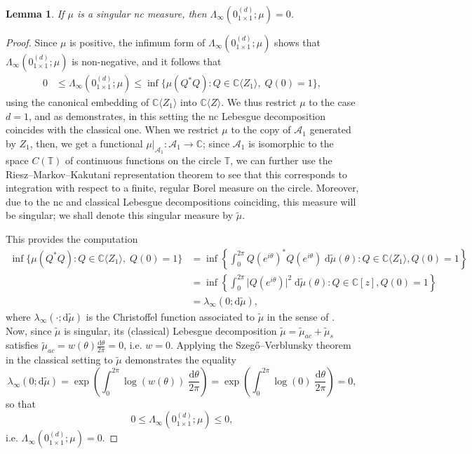 \documentclass[11pt,reqno]{amsart}
\def\l{\lambda}
\def\th{\theta}
\def\L{\Lambda}
\def\rmd{\mathrm{d}}
\def\CC{\mathbb{C}}
\def\TT{\mathbb{T}}
\def\cA{\mathcal{A}}
\newtheorem{lemma}[theorem]{Lemma}
\theoremstyle{definition}
\numberwithin{equation}{section}
\renewcommand{\tilde}{\widetilde}
\begin{document}
\begin{lemma}
    \label{lem:ZeroEntropy}
    If \(\mu\) is a singular nc measure, then \(\L_{\infty}(0_{1\times1}^{(d)}; \mu) = 0\).
\end{lemma}
\begin{proof}
    
    Since \(\mu\) is positive, the infimum form of \(\L_{\infty}(0_{1\times 1}^{(d)}; \mu)\) shows that \(\L_{\infty}(0_{1\times 1}^{(d)}; \mu)\) is non-negative, and it follows that
    \begin{align*}
        0 & \leq \L_{\infty}(0_{1\times 1}^{(d)}; \mu) \leq \inf\{\mu(Q^*Q) : Q \in \CC\langle Z_1\rangle, \; Q(0) = 1\},
    \end{align*}
    using the canonical embedding of \(\CC\langle Z_1\rangle\) into \(\CC\langle Z \rangle\). We thus restrict \(\mu\) to the case \(d = 1\), and as \cite[Corollary 8.5]{JM22b} demonstrates, in this setting the nc Lebesgue decomposition coincides with the classical one. When we restrict \(\mu\) to the copy of \(\cA_1\) generated by \(Z_1\), then, we get a functional \(\mu \vert_{\cA_1} : \cA_1 \to \CC\); since \(\cA_1\) is isomorphic to the space \(C(\TT)\) of continuous functions on the circle \(\TT\), we can further use the Riesz--Markov--Kakutani representation theorem \cite[Theorem 2.17]{Rud87} to see that this corresponds to integration with respect to a finite, regular Borel measure on the circle. Moreover, due to the nc and classical Lebesgue decompositions coinciding, this measure will be singular; we shall denote this singular measure by \(\tilde{\mu}\).
    
    This provides the computation
    \begin{align*}
        \inf\{\mu(Q^*Q) : Q \in \CC\langle Z_1\rangle, \; Q(0) = 1\} & = \inf\left\{\int_0^{2\pi} Q(e^{i\theta})^*Q(e^{i\theta}) \; \rmd \tilde{\mu}(\theta) : Q \in \CC\langle Z_1\rangle, Q(0) = 1\right\}\\
        & = \inf\left\{\int_0^{2\pi} \lvert Q(e^{i\theta}) \rvert^2 \; \rmd \tilde{\mu}(\theta) : Q \in \CC[z], Q(0) = 1\right\} \\
        & = \l_{\infty}(0 ; \rmd \tilde{\mu}),
    \end{align*}
    where \(\l_{\infty}(\cdot; \rmd \tilde{\mu})\) is the Christoffel function associated to \(\tilde{\mu}\) in the sense of \cite{Sim05}. Now, since \(\tilde{\mu}\) is singular, its (classical) Lebesgue decomposition \(\tilde{\mu} = \tilde{\mu}_{ac} + \tilde{\mu}_s\) satisfies \(\tilde{\mu}_{ac} = w(\th) \frac{\rmd \th}{2\pi} = 0\), i.e. \(w = 0\). Applying the Szeg\H{o}--Verblunsky theorem in the classical setting to \(\tilde{\mu}\) demonstrates the equality
    \[
        \l_{\infty}(0 ; \rmd \tilde{\mu}) = \exp\left(\int_0^{2\pi} \log(w(\th)) \; \frac{\rmd \th}{2\pi}\right) = \exp\left(\int_0^{2\pi} \log(0) \; \frac{\rmd \th}{2\pi}\right) = 0,
    \]
    so that 
    \[
        0 \leq \L_{\infty}(0_{1\times 1}^{(d)}; \mu) \leq 0,
    \]
    i.e. \(\L_{\infty}(0_{1\times 1}^{(d)}; \mu) = 0\).
\end{proof}
\end{document}
